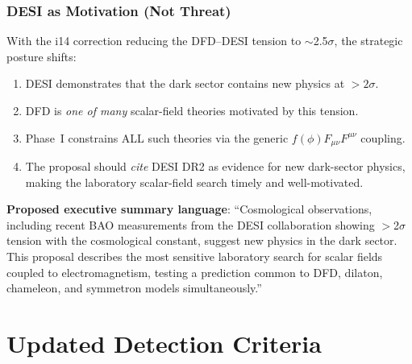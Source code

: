 \documentclass[11pt]{article}
\theoremstyle{definition}
\theoremstyle{remark}
\begin{document}
\section{DESI as Motivation (Not Threat)}
\label{sec:desi-motivation}

With the i14 correction reducing the DFD--DESI tension to
$\sim$2.5$\sigma$, the strategic posture shifts:

\begin{enumerate}[nosep]
\item DESI demonstrates that the dark sector contains new physics
  at $>2\sigma$.
\item DFD is \emph{one of many} scalar-field theories motivated by
  this tension.
\item Phase~I constrains ALL such theories via the generic
  $f(\phi)F_{\mu\nu}F^{\mu\nu}$ coupling.
\item The proposal should \emph{cite} DESI DR2 as evidence for new
  dark-sector physics, making the laboratory scalar-field search
  timely and well-motivated.
\end{enumerate}

\textbf{Proposed executive summary language}: ``Cosmological
observations, including recent BAO measurements from the DESI
collaboration showing $>$2$\sigma$ tension with the cosmological
constant, suggest new physics in the dark sector. This proposal
describes the most sensitive laboratory search for scalar fields
coupled to electromagnetism, testing a prediction common to DFD,
dilaton, chameleon, and symmetron models simultaneously.''


\part{Updated Detection Criteria}
\label{part:criteria}
\end{document}
